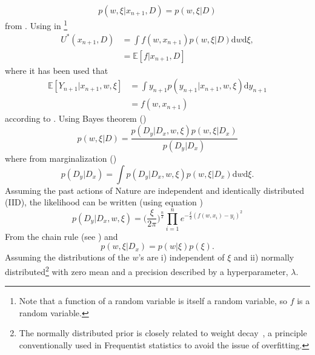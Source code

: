 \begin{equation}
	p(w,\xi|x_{n+1},D) = p(w,\xi|D)
\end{equation} 
from . Using  in \footnote{Note that a function of a random variable is itself a random variable, so $f$ is a random variable.}
\begin{equation}
	\begin{split}
		U^*(x_{n+1},D) & = \int f(w,x_{n+1})  p(w,\xi|D) \mathrm{d}w \mathrm{d}\xi,\\
		& = \mathbb{E}[f|x_{n+1},D]
	\end{split}
	\label{eq:q3}
\end{equation}	
where it has been used that
\begin{equation}
	\begin{split}
		\mathbb{E}[Y_{n+1}|x_{n+1},w,\xi] &= \int y_{n+1} p(y_{n+1}|x_{n+1},w,\xi) \mathrm{d}y_{n+1} \\
		&= f(w,x_{n+1})
	\end{split}
\end{equation}
according to . Using Bayes theorem ()
\begin{equation}
	p(w,\xi|D) = \frac{p(D_y|D_x,w,\xi)p(w,\xi|D_x)}{p(D_y|D_x)}
	\label{eq:bayes2}
\end{equation}
where from marginalization ()
\begin{equation}
	p(D_y|D_x) = \int p(D_y|D_x,w,\xi)p(w,\xi|D_x) \mathrm{d}w \mathrm{d}\xi.
\end{equation}
Assuming the past actions of Nature are independent and identically distributed (IID), the likelihood can be written (using equation )
\begin{equation}
	p(D_y|D_x,w,\xi) = \bigg(\frac{\xi}{2\pi}\bigg)^\frac{n}{2}\prod_{i=1}^n e^{-\frac{\xi}{2}(f(w,x_i)-y_i)^2}
	\label{reg:likelihood}
\end{equation}
From the chain rule (see ) and 
\begin{equation}
	p(w,\xi|D_x) = p(w|\xi)p(\xi).
\end{equation}
Assuming the distributions of the $w$'s are i) independent of $\xi$ and ii) normally distributed\footnote{The normally distributed prior is closely related to weight decay~\citep{Plaut1986}, a principle conventionally used in Frequentist statistics to avoid the issue of overfitting.} with zero mean and a precision described by a hyperparameter, $\lambda$. 	 

